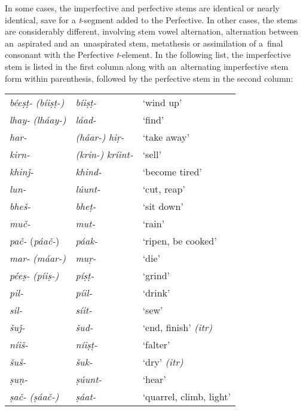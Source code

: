In some cases, the imperfective and perfective stems are identical or nearly identical, save for a \textit{t}-segment added to the Perfective. In other cases, the stems are considerably different, involving stem vowel alternation, alternation between an~aspirated and an~unaspirated stem, metathesis or assimilation of a~final consonant with the Perfective \textit{t}-element. In the following list, the imperfective stem is listed in the first column along with an~alternating imperfective stem form within parenthesis, followed by the perfective stem in the second column:


\begin{table}[H]
\begin{tabularx}{\textwidth}{ l@{\hspace{40pt}} l@{\hspace{40pt}} Q }
\textit{béeṣṭ-} \textit{(bíiṣṭ-)} &
\textit{bíiṣṭ-}	&
`wind up' \\
\textit{lhay-} \textit{(lháay-)}	&
\textit{láad-}	&
`find' \\
\textit{har-} &
\textit{(háar-)}	\textit{hiṛ-}	&
`take away' \\
\textit{kirn-} &
\textit{(krin-)} \textit{kríint-}	&
`sell' \\
\textit{khinǰ-}&
\textit{khind-}	&
`become tired' \\
\textit{lun-} &
\textit{lúunt-}	&
`cut, reap' \\
\textit{bheš-} &
\textit{bheṭ-}	&
`sit down' \\
\textit{muč-} &
\textit{mut-}	&
`rain' \\
\textit{\textit{pač-}} (\textit{páač-})	&
\textit{páak-}	&
`ripen, be cooked' \\
\textit{mar-} \textit{(máar-)}&
\textit{muṛ-}	&
`die' \\
\textit{péeṣ-} \textit{(píiṣ-)} &
\textit{píṣṭ-}	&
`grind' \\
\textit{pil-} &\textit{píil-}	&
`drink' \\
\textit{sil-} &\textit{síit-}	&
`sew' \\
\textit{šuǰ-} &\textit{šud-}	&
`end, finish' \textit{(itr)}\\
\textit{níiš-} &\textit{níiṣṭ-}	&
`falter' \\
\textit{šuš-} &\textit{šuk-}	&
`dry'  \textit{(itr)} \\
\textit{ṣuṇ-} &\textit{ṣúunt-}	&
`hear' \\
\textit{ṣač-} \textit{(ṣáač-)} &	\textit{ṣáat-}	&
`quarrel, climb, light' \\
\end{tabularx}
\end{table}

